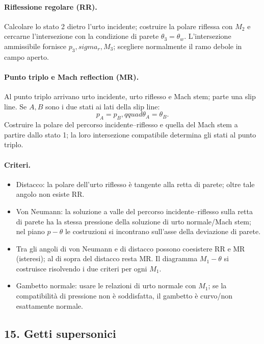 \documentclass[11pt,a4paper]{article}
\begin{document}
\paragraph*{Riflessione regolare (RR).}
Calcolare lo stato 2 dietro l'urto incidente; costruire la polare riflessa con $M_2$ e
cercarne l'intersezione con la condizione di parete $\theta_3=\theta_w$.
L'intersezione ammissibile fornisce $p_3,sigma_r,M_3$; scegliere normalmente il ramo
debole in campo aperto.

\paragraph*{Punto triplo e Mach reflection (MR).}
Al punto triplo arrivano urto incidente, urto riflesso e Mach stem; parte una slip line.
Se $A,B$ sono i due stati ai lati della slip line:
\[
p_A=p_B,qquad \theta_A=\theta_B.
\]
Costruire la polare del percorso incidente--riflesso e quella del Mach stem a partire
dallo stato 1; la loro intersezione compatibile determina gli stati al punto triplo.

\paragraph*{Criteri.}
\begin{itemize}
\item Distacco: la polare dell'urto riflesso è tangente alla retta di parete; oltre tale
angolo non esiste RR.
\item Von Neumann: la soluzione a valle del percorso incidente--riflesso sulla retta di
parete ha la stessa pressione della soluzione di urto normale/Mach stem; nel piano
$p-\theta$ le costruzioni si incontrano sull'asse della deviazione di parete.
\item Tra gli angoli di von Neumann e di distacco possono coesistere RR e MR (isteresi);
al di sopra del distacco resta MR. Il diagramma $M_1-\theta$ si costruisce risolvendo i
due criteri per ogni $M_1$.
\item Gambetto normale: usare le relazioni di urto normale con $M_1$; se la compatibilità
di pressione non è soddisfatta, il gambetto è curvo/non esattamente normale.
\end{itemize}


\subsection*{15. Getti supersonici}
\end{document}
